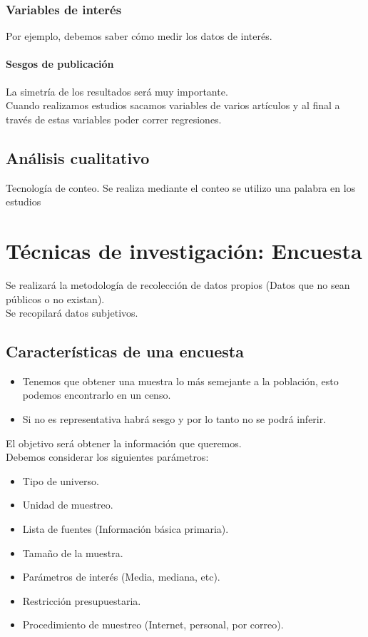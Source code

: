 \subsection{Variables de interés}
Por ejemplo, debemos saber cómo medir los datos de interés.

\subsubsection{Sesgos de publicación}
La simetría de los resultados será muy importante.\\

Cuando realizamos estudios sacamos variables de varios artículos y al final a través de estas variables poder correr regresiones.


\section{Análisis cualitativo}
Tecnología de conteo. Se realiza mediante el conteo se utilizo una palabra en los estudios 


\chapter{Técnicas de investigación: Encuesta}
Se realizará la metodología de recolección de datos propios (Datos que no sean públicos o no existan).\\

Se recopilará datos subjetivos.

\section{Características de una encuesta}
\begin{itemize}
    \item Tenemos que obtener una muestra lo más semejante a la población, esto podemos encontrarlo en un censo.
    \item Si no es representativa habrá sesgo y por lo tanto no se podrá inferir.
\end{itemize}

El objetivo será obtener la información que queremos.\\

Debemos considerar los siguientes parámetros:
\begin{itemize}
    \item Tipo de universo.
    \item Unidad de muestreo.
    \item Lista de fuentes (Información básica primaria).
    \item Tamaño de la muestra.
    \item Parámetros de interés (Media, mediana, etc).
    \item Restricción presupuestaria.
    \item Procedimiento de muestreo (Internet, personal, por correo).
\end{itemize}

